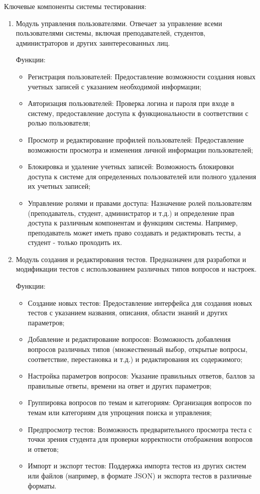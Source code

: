 Ключевые компоненты системы тестирования:

\begin{enumerate}
	\item Модуль управления пользователями. Отвечает за управление всеми пользователями системы, включая преподавателей, студентов, администраторов и других заинтересованных лиц.
	
	Функции:
	
	\begin{itemize}
		\item Регистрация пользователей: Предоставление возможности создания новых учетных записей с указанием необходимой информации;
		\item Авторизация пользователей: Проверка логина и пароля при входе в систему, предоставление доступа к функциональности в соответствии с ролью пользователя;
		\item Просмотр и редактирование профилей пользователей: Предоставление возможности просмотра и изменения личной информации пользователей;
		\item Блокировка и удаление учетных записей: Возможность блокировки доступа к системе для определенных пользователей или полного удаления их учетных записей;
		\item Управление ролями и правами доступа: Назначение ролей пользователям (преподаватель, студент, администратор и т.д.) и определение прав доступа к различным компонентам и функциям системы. Например, преподаватель может иметь право создавать и редактировать тесты, а студент - только проходить их.
	\end{itemize}
	
	\item Модуль создания и редактирования тестов. Предназначен для разработки и модификации тестов с использованием различных типов вопросов и настроек.
	
	Функции:
	
	\begin{itemize}
		\item Создание новых тестов: Предоставление интерфейса для создания новых тестов с указанием названия, описания, области знаний и других параметров;
		\item Добавление и редактирование вопросов: Возможность добавления вопросов различных типов (множественный выбор, открытые вопросы, соответствие, перестановка и т.д.) и редактирования их содержимого;
		\item Настройка параметров вопросов: Указание правильных ответов, баллов за правильные ответы, времени на ответ и других параметров;
		\item Группировка вопросов по темам и категориям: Организация вопросов по темам или категориям для упрощения поиска и управления;
		\item Предпросмотр тестов: Возможность предварительного просмотра теста с точки зрения студента для проверки корректности отображения вопросов и ответов;
		\item Импорт и экспорт тестов: Поддержка импорта тестов из других систем или файлов (например, в формате JSON) и экспорта тестов в различные форматы.
	\end{itemize}
	

\end{enumerate}
